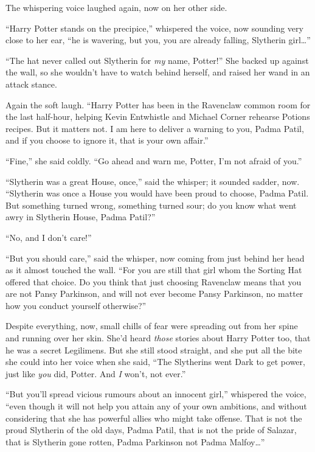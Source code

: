 The whispering voice laughed again, now on her other side.

“Harry Potter stands on the precipice,” whispered the voice, now sounding very close to her ear, “he is wavering, but you, you are already falling, Slytherin girl…”

“The hat never called out Slytherin for \emph{my} name, Potter!” She backed up against the wall, so she wouldn’t have to watch behind herself, and raised her wand in an attack stance.

Again the soft laugh. “Harry Potter has been in the Ravenclaw common room for the last half-hour, helping Kevin Entwhistle and Michael Corner rehearse Potions recipes. But it matters not. I am here to deliver a warning to you, Padma Patil, and if you choose to ignore it, that is your own affair.”

“Fine,” she said coldly. “Go ahead and warn me, Potter, I’m not afraid of you.”

“Slytherin was a great House, once,” said the whisper; it sounded sadder, now. “Slytherin was once a House you would have been proud to choose, Padma Patil. But something turned wrong, something turned sour; do you know what went awry in Slytherin House, Padma Patil?”

“No, and I don’t care!”

“But you should care,” said the whisper, now coming from just behind her head as it almost touched the wall. “For you are still that girl whom the Sorting Hat offered that choice. Do you think that just choosing Ravenclaw means that you are not Pansy Parkinson, and will not ever become Pansy Parkinson, no matter how you conduct yourself otherwise?”

Despite everything, now, small chills of fear were spreading out from her spine and running over her skin. She’d heard \emph{those} stories about Harry Potter too, that he was a secret Legilimens. But she still stood straight, and she put all the bite she could into her voice when she said, “The Slytherins went Dark to get power, just like \emph{you} did, Potter. And \emph{I} won’t, not ever.”

“But you’ll spread vicious rumours about an innocent girl,” whispered the voice, “even though it will not help you attain any of your own ambitions, and without considering that she has powerful allies who might take offense. That is not the proud Slytherin of the old days, Padma Patil, that is not the pride of Salazar, that is Slytherin gone rotten, Padma Parkinson not Padma Malfoy…”

